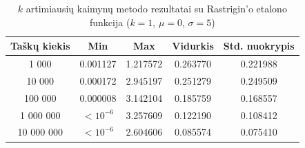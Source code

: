 \begin{table}[H]
    \centering
    \begin{tabular}{|c|c|c|c|c|}
        \hline
        \textbf{Taškų kiekis} & \textbf{Min} & \textbf{Max} & \textbf{Vidurkis} & \textbf{Std. nuokrypis} \\ \hline
        1 000        & 0.001127 & 1.217572 & 0.263770 & 0.221988 \\ \hline
        10 000       & 0.000172 & 2.945197 & 0.251279 & 0.249509 \\ \hline
        100 000      & 0.000008 & 3.142104 & 0.185759 & 0.168557 \\ \hline
        1 000 000    & $<10^{-6}$ & 3.257609 & 0.122190 & 0.108412 \\ \hline
        10 000 000   & $<10^{-6}$ & 2.604606 & 0.085574 & 0.075410 \\ \hline
    \end{tabular}
    \caption{$k$ artimiausių kaimynų metodo rezultatai su Rastrigin'o etalono funkcija ($k = 1$, $\mu = 0$, $\sigma = 5$)}
\end{table}